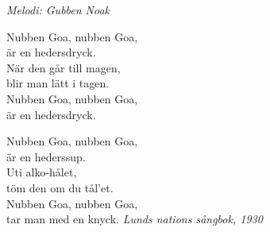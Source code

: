 {\footnotesize\textit{Melodi: Gubben Noak}}\par
\vspace{10pt}
\par
Nubben Goa, nubben Goa,\\
är en hedersdryck.\\
När den går till magen,\\
blir man lätt i tagen.\\
Nubben Goa, nubben Goa,\\
är en hedersdryck.\par
\vspace{10pt}
Nubben Goa, nubben Goa,\\
är en hederssup.\\
Uti alko-hålet,\\
töm den om du tål'et.\\
Nubben Goa, nubben Goa,\\
tar man med en knyck.
\vspace{10pt}
{\footnotesize\textit{Lunds nations sångbok, 1930}}
